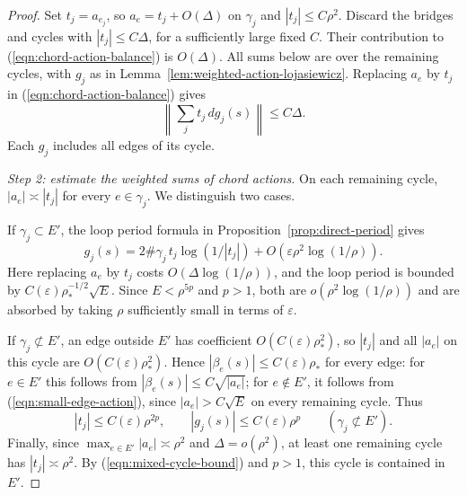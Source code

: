 \documentclass[11pt,a4paper]{article}
\numberwithin{equation}{section}
\theoremstyle{definition}
\theoremstyle{remark}
\begin{document}
\begin{proof}
		Set $t_j=a_{e_j}$, so $a_e=t_j+O(\Delta)$ on $\gamma_j$ and
		$|t_j|\le C\rho^2$.
		Discard the bridges and cycles with $|t_j|\le C\Delta$, for a sufficiently
		large fixed $C$. Their contribution to (\ref{eqn:chord-action-balance}) is
		$O(\Delta)$. All sums below are over the remaining cycles, with $g_j$
		as in Lemma~\ref{lem:weighted-action-lojasiewicz}.
		Replacing $a_e$ by $t_j$ in (\ref{eqn:chord-action-balance}) gives
		\begin{equation}\label{eqn:cycle-derivative}
			\left\|\sum_jt_j\,dg_j(s)\right\|\le C\Delta.
		\end{equation}
		Each $g_j$ includes all edges of its cycle.
		
		\smallskip
		\noindent\emph{Step 2: estimate the weighted sums of chord actions.}
		On each remaining cycle, $|a_e|\asymp|t_j|$ for every $e\in \gamma_j$.
		We distinguish two cases.
		
		If $\gamma_j\subset E'$, the loop period formula in
		Proposition~\ref{prop:direct-period} gives
		\begin{equation}\label{eqn:cycle-period}
			g_j(s)=2\#\gamma_j\,t_j\log(1/|t_j|)
			+O\!\left(\varepsilon\rho^2\log(1/\rho)\right).
		\end{equation}
		Here replacing $a_e$ by $t_j$ costs $O(\Delta\log(1/\rho))$,
		and the loop period is bounded by $C(\varepsilon)\rho_*^{-1/2}\sqrt E$.
		Since $E<\rho^{5p}$ and $p>1$, both are $o(\rho^2\log(1/\rho))$
		and are absorbed by taking $\rho$ sufficiently small in terms of
		$\varepsilon$.
		
		If $\gamma_j\not\subset E'$, an edge outside $E'$ has coefficient
		$O(C(\varepsilon)\rho_*^2)$, so $|t_j|$ and all $|a_e|$ on this cycle are
		$O(C(\varepsilon)\rho_*^2)$. Hence $|\beta_e(s)|\le C(\varepsilon)\rho_*$ for every edge:
		for $e\in E'$ this follows from $|\beta_e(s)|\le C\sqrt{|a_e|}$;
		for $e\notin E'$, it follows from (\ref{eqn:small-edge-action}),
		since $|a_e|>C\sqrt E$ on every remaining cycle.
		Thus
		\begin{equation}\label{eqn:mixed-cycle-bound}
			|t_j|\le C(\varepsilon)\rho^{2p},\qquad |g_j(s)|\le C(\varepsilon)\rho^p
			\qquad(\gamma_j\not\subset E').
		\end{equation}
		Finally, since $\max_{e\in E'}|a_e|\asymp\rho^2$ and $\Delta=o(\rho^2)$,
		at least one remaining cycle has $|t_j|\asymp\rho^2$.
		By (\ref{eqn:mixed-cycle-bound}) and $p>1$, this cycle is contained in $E'$.
		

\end{proof}
\end{document}
